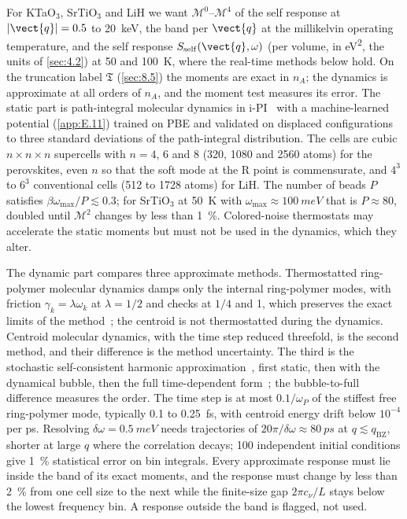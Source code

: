 For KTaO$_3$, SrTiO$_3$ and LiH we want $\mathscr{M}^0$--$\mathscr{M}^4$ of the self response at $|\vect{q}| = 0.5$ to \SI{20}{keV}, the band per $\vect{q}$ at the millikelvin operating temperature, and the self response $S_{\mathrm{self}}(\vect{q},\omega)$ (per volume, in \si{eV^2}, the units of \cref{sec:4.2}) at 50 and \SI{100}{K}, where the real-time methods below hold. On the truncation label $\mathfrak{T}$ (\cref{sec:8.5}) the moments are exact in $n_A$; the dynamics is approximate at all orders of $n_A$, and the moment test measures its error. The static part is path-integral molecular dynamics in i-PI~\cite{kapil2019ipi} with a machine-learned potential (\cref{app:E.11}) trained on PBE and validated on displaced configurations to three standard deviations of the path-integral distribution. The cells are cubic $n\times n\times n$ supercells with $n = 4$, 6 and 8 (320, 1080 and 2560 atoms) for the perovskites, even $n$ so that the soft mode at the R point is commensurate, and $4^3$ to $6^3$ conventional cells (512 to 1728 atoms) for LiH. The number of beads $P$ satisfies $\beta\omega_{\mathrm{max}}/P \lesssim 0.3$; for SrTiO$_3$ at \SI{50}{K} with $\omega_{\mathrm{max}} \approx \SI{100}{meV}$ that is $P \approx 80$, doubled until $\mathscr{M}^2$ changes by less than \SI{1}{\percent}. Colored-noise thermostats may accelerate the static moments but must not be used in the dynamics, which they alter.

The dynamic part compares three approximate methods. Thermostatted ring-polymer molecular dynamics damps only the internal ring-polymer modes, with friction $\gamma_k = \lambda\omega_k$ at $\lambda = 1/2$ and checks at $1/4$ and 1, which preserves the exact limits of the method~\cite{rossi2014remove}; the centroid is not thermostatted during the dynamics. Centroid molecular dynamics, with the time step reduced threefold, is the second method, and their difference is the method uncertainty. The third is the stochastic self-consistent harmonic approximation~\cite{monacelli2021stochastic}, first static, then with the dynamical bubble, then the full time-dependent form~\cite{monacelli2021time}; the bubble-to-full difference measures the order. The time step is at most $0.1/\omega_P$ of the stiffest free ring-polymer mode, typically 0.1 to \SI{0.25}{fs}, with centroid energy drift below $10^{-4}$ per ps. Resolving $\delta\omega = \SI{0.5}{meV}$ needs trajectories of $20\pi/\delta\omega \approx \SI{80}{ps}$ at $q \lesssim q_{\mathrm{BZ}}$, shorter at large $q$ where the correlation decays; 100 independent initial conditions give \SI{1}{\percent} statistical error on bin integrals. Every approximate response must lie inside the band of its exact moments, and the response must change by less than \SI{2}{\percent} from one cell size to the next while the finite-size gap $2\pi c_\nu/L$ stays below the lowest frequency bin. A response outside the band is flagged, not used.

